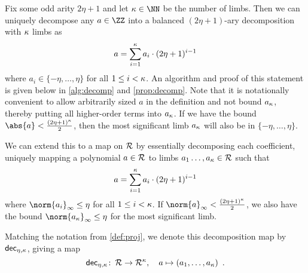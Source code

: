 \begin{definition}\label{def:decomp_R}
    Fix some odd arity $2\eta+1$ and let $\limbs\in\NN$ be the number of limbs.
    Then we can uniquely decompose any $a\in\ZZ$ into a balanced $(2\eta+1)$-ary decomposition with $\kappa$ limbs as
    \[
     a = \sum_{i=1}^{\kappa} a_i \cdot (2\eta+1)^{i-1}
    \]
    where $a_i \in \{-\eta,\ldots, \eta\}$ for all $1\leq i <\kappa$.
    An algorithm and proof of this statement is given below in \autoref{alg:decomp} and \autoref{prop:decomp}.
    Note that it is notationally convenient to allow arbitrarily sized $a$ in the definition and not bound $a_{\kappa}$, thereby putting all higher-order terms into $a_\kappa$.
    If we have the bound $\abs{a} < \tfrac{(2\eta+1)^\limbs}{2}$, then the most significant limb $a_{\kappa}$ will also be in $\{-\eta,\ldots,\eta\}$.
    
    We can extend this to a map on $\mathcal{R}$ by essentially decomposing each coefficient, uniquely mapping a polynomial $a\in\mathcal{R}$ to limbs $a_1\ldots,a_{\kappa}\in \mathcal{R}$ such that
    \[
     a = \sum_{i=1}^{\kappa} a_i \cdot (2\eta+1)^{i-1}
    \]
    where $\norm{a_i}_{\infty} \leq \eta$ for all $1\leq i < \kappa$. If $\norm{a}_{\infty} < \tfrac{(2\eta+1)^\limbs}{2}$, we also have the bound $\norm{a_\limbs}_{\infty} \leq \eta$ for the most significant limb.
    
    Matching the notation from \autoref{def:proj}, we denote this decomposition map by $\mathsf{dec}_{\eta,\kappa}$, giving a map
    \[
     \mathsf{dec}_{\eta,\kappa} \colon\, \mathcal{R} \to \mathcal{R}^{\kappa},\quad a \mapsto (a_1,\ldots,a_{\kappa})\enspace.
    \]
\end{definition}
